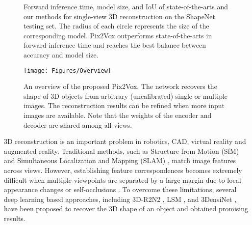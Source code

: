 \documentclass[10pt,twocolumn,letterpaper]{article}
\begin{document}
\begin{figure}[!t]
{
  }
  \caption{Forward inference time, model size, and IoU of state-of-the-arts and our methods for single-view 3D reconstruction on the ShapeNet testing set. The radius of each circle represents the size of the corresponding model. Pix2Vox outperforms state-of-the-arts in forward inference time and reaches the best balance between accuracy and model size.}
  \label{fig:performance-comparison}
  \vspace{-3 mm}
\end{figure}

\begin{figure*}
  \centering
  \resizebox{\linewidth}{!} {
    \texttt{[image: Figures/Overview]}
  }
  \caption{An overview of the proposed Pix2Vox. The network recovers the shape of 3D objects from arbitrary (uncalibrated) single or multiple images. The reconstruction results can be refined when more input images are available. Note that the weights of the encoder and decoder are shared among all views.}
  \label{fig:overview}
  \vspace{-3 mm}
\end{figure*}

3D reconstruction is an important problem in robotics, CAD, virtual reality and augmented reality.
Traditional methods, such as Structure from Motion (SfM) \cite{DBLP:journals/acta/OnurVRA17} and Simultaneous Localization and Mapping (SLAM) \cite{DBLP:journals/air/Fuentes-PachecoAR15},  match image features across views.
However, establishing feature correspondences becomes extremely difficult when multiple viewpoints are separated by a large margin due to local appearance changes or self-occlusions \cite{DBLP:journals/ijcv/Lowe04}.
To overcome these limitations, several deep learning based approaches, including 3D-R2N2 \cite{DBLP:conf/eccv/ChoyXGCS16}, LSM \cite{DBLP:conf/nips/KarHM17}, and 3DensiNet \cite{DBLP:conf/mm/WangWF17}, have been proposed to recover the 3D shape of an object and obtained promising results.
\end{document}
